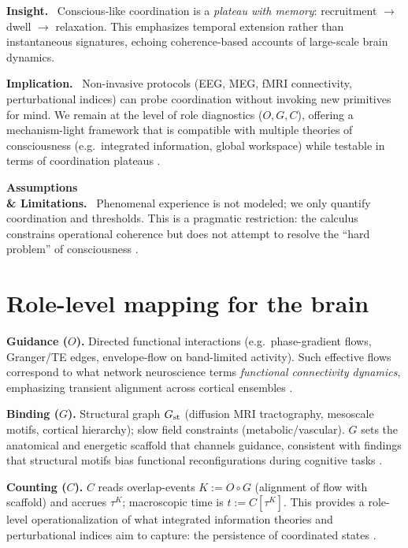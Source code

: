 \documentclass[12pt,a4paper,oneside]{scrreprt}
\newenvironment{insight}{\par\vspace{0.5em}\noindent\textbf{Insight.}\ }{\par\vspace{0.5em}}
\newenvironment{implication}{\par\vspace{0.5em}\noindent\textbf{Implication.}\ }{\par\vspace{0.5em}}
\newenvironment{limitation}{\par\vspace{0.5em}\noindent\textbf{Assumptions \\ \& Limitations.}\ }{\par\vspace{0.5em}}
\begin{document}
\begin{insight}
Conscious-like coordination is a \emph{plateau with memory}: recruitment $\to$ dwell $\to$ relaxation. 
This emphasizes temporal extension rather than instantaneous signatures, echoing coherence-based accounts of large-scale brain dynamics.
\end{insight}

\begin{implication}
Non-invasive protocols (EEG, MEG, fMRI connectivity, perturbational indices) can probe coordination without invoking new primitives for mind. 
We remain at the level of role diagnostics ($O,G,C$), offering a mechanism-light framework that is compatible with multiple theories of consciousness (e.g.\ integrated information, global workspace) while testable in terms of coordination plateaus \cite{massimini2009,dehaene2011}.
\end{implication}

\begin{limitation}
Phenomenal experience is not modeled; we only quantify coordination and thresholds. 
This is a pragmatic restriction: the calculus constrains operational coherence but does not attempt to resolve the ``hard problem'' of consciousness \cite{chalmers1995}.
\end{limitation}

\section{Role-level mapping for the brain}\label{sec:human-mapping}
\textbf{Guidance ($O$).} Directed functional interactions (e.g.\ phase-gradient flows, Granger/TE edges, envelope-flow on band-limited activity). Such effective flows correspond to what network neuroscience terms \emph{functional connectivity dynamics}, emphasizing transient alignment across cortical ensembles \cite{friston2016,sporns2013}.  

\textbf{Binding ($G$).} Structural graph $G_{\rm st}$ (diffusion MRI tractography, mesoscale motifs, cortical hierarchy); slow field constraints (metabolic/vascular). $G$ sets the anatomical and energetic scaffold that channels guidance, consistent with findings that structural motifs bias functional reconfigurations during cognitive tasks \cite{dehaene2011,tononi2008}.  

\textbf{Counting ($C$).} $C$ reads overlap-events $K:=O\!\circ G$ (alignment of flow with scaffold) and accrues $\tau^K$; macroscopic time is $t:=C[\tau^K]$. This provides a role-level operationalization of what integrated information theories and perturbational indices aim to capture: the persistence of coordinated states \cite{massimini2009,tononi2008}.  
\end{document}
